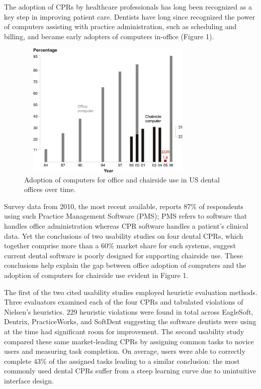 \documentclass[11pt]{article}
\begin{document}
The adoption of CPRs by healthcare professionals has long been recognized as a key step in improving patient care.\cite{Chasteen1992A-computer-data,Eisne1993The-computer-ba,Thompson2004The-Decade-of-H} Dentists have long since recognized the power of computers assisting with practice administration, such as scheduling and billing, and became early adopters of computers in-office (Figure 1).
\label{fig:1}
\begin{figure}[!b]
\begin{center}
\includegraphics[width=250pt, height=185pt]{comp.png}
\end{center}
\caption{Adoption of computers for office and chairside use in US dental offices over time.\cite{Schleyer2006Clinical-Comput}}
\end{figure}Survey data from 2010, the most recent available, reports 87\% of respondents using such Practice Management Software (PMS); PMS refers to software that handles office administration whereas CPR software handles a patient's clinical data.\cite{Levine2010} Yet the conclusions of two usability studies on four dental CPRs, which together comprise more than a 60\% market share for such systems, suggest current dental software is poorly designed for supporting chairside use.\cite{Thyvalikakath2007Heuristic-evalu,Thyvalikakath2008A-usability-eva} These conclusions help explain the gap between office adoption of computers and the adoption of computers for chairside use evident in Figure 1. 

The first of the two cited usability studies employed heuristic evaluation methods.\cite{Nielsen1994Usability-Inspe} Three evaluators examined each of the four CPRs and tabulated violations of Nielsen's heuristics. 229 heuristic violations were found in total across EagleSoft, Dentrix, PracticeWorks, and SoftDent suggesting the software dentists were using at the time had significant room for improvement. The second usability study compared\cite{Nielsen1994Enhancing-the-e} these same market-leading CPRs by assigning common tasks to novice users and measuring task completion. On average, users were able to correctly complete 43\% of the assigned tasks leading to a similar conclusion: the most commonly used dental CPRs suffer from a steep learning curve due to unintuitive interface design.
\end{document}
